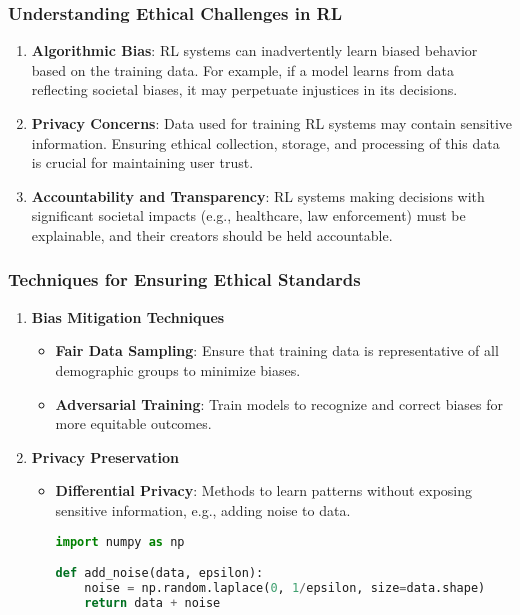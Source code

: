 \documentclass[aspectratio=169]{beamer}
\begin{document}
\begin{frame}[fragile]
    \frametitle{Understanding Ethical Challenges in RL}
    \begin{enumerate}
        \item \textbf{Algorithmic Bias}: RL systems can inadvertently learn biased behavior based on the training data. For example, if a model learns from data reflecting societal biases, it may perpetuate injustices in its decisions.
        
        \item \textbf{Privacy Concerns}: Data used for training RL systems may contain sensitive information. Ensuring ethical collection, storage, and processing of this data is crucial for maintaining user trust.
        
        \item \textbf{Accountability and Transparency}: RL systems making decisions with significant societal impacts (e.g., healthcare, law enforcement) must be explainable, and their creators should be held accountable.
    \end{enumerate}
\end{frame}

\begin{frame}[fragile]
    \frametitle{Techniques for Ensuring Ethical Standards}
    \begin{enumerate}
        \item \textbf{Bias Mitigation Techniques}
        \begin{itemize}
            \item \textbf{Fair Data Sampling}: Ensure that training data is representative of all demographic groups to minimize biases.
            \item \textbf{Adversarial Training}: Train models to recognize and correct biases for more equitable outcomes.
        \end{itemize}
        
        \item \textbf{Privacy Preservation}
        \begin{itemize}
            \item \textbf{Differential Privacy}: Methods to learn patterns without exposing sensitive information, e.g., adding noise to data.
            \begin{lstlisting}[language=Python]
import numpy as np

def add_noise(data, epsilon):
    noise = np.random.laplace(0, 1/epsilon, size=data.shape)
    return data + noise
            \end{lstlisting}
        \end{itemize}
    \end{enumerate}
\end{frame}
\end{document}
